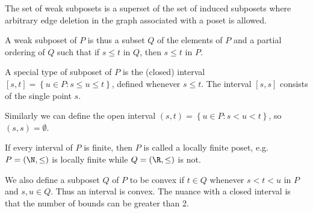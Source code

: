 
The set of weak subposets is a superset of the set of induced subposets where
arbitrary edge deletion in the graph associated with a poset is allowed.


A weak subposet of $P$ is thus a subset $Q$ of the elements of $P$ and a
partial ordering of $Q$ such that if $s \leq t$ in $Q$, then $s \leq t$ in $P$.



A special type of subposet of $P$ is the (closed) interval $[s, t] = \left\{{u
\in P : s \leq u \leq t}\right\}$, defined whenever $s \leq t$. The interval
$[s, s]$ consists of the single point $s$.


Similarly we can define the open interval $(s, t) = \left\{{u \in P : s < u <
t}\right\}$, so $(s, s) = \emptyset$.

If every interval of $P$ is finite, then $P$ is called a locally finite poset,
e.g. $P = (\N, \le)$ is locally finite while $Q = (\R, \le)$ is
not.


We also define a subposet $Q$ of $P$ to be convex if $t \in Q$ whenever $s < t
< u$ in $P$ and $s, u \in Q$. Thus an interval is convex. The nuance with a
closed interval is that the number of bounds can be greater than 2.


